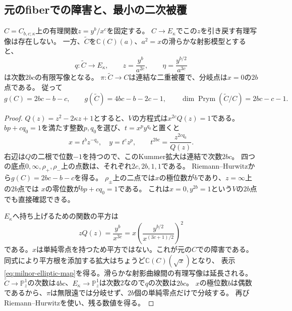 \subsection{元のfiberでの障害と、最小の二次被覆}
\begin{theorem}[平方類を解消するKummer被覆]
\label{thm:boundary-kummer-prym}
$C=C_{b,c;\kappa}$上の有理関数$z=y^b/x^c$を固定する。
$C\to E_\kappa$でこの$z$を引き戻す有理写像は存在しない。
一方、$\widetilde C$を$\mathbb C(C)(a)$、$a^2=x$の滑らかな射影模型とすると、
\begin{equation}\label{eq:milnor-elliptic-map}
 q:\widetilde C\longrightarrow E_\kappa,\qquad
 z=\frac{y^b}{a^{2c}},\qquad \eta=\frac{y^{b/2}}{a^{3c}}
\end{equation}
は次数$2bc$の有限写像となる。
$\pi:\widetilde C\to C$は連結な二重被覆で、分岐点は$x=0$の$2b$点である。
従って
\[
 g(C)=2bc-b-c,\qquad
 g(\widetilde C)=4bc-b-2c-1,\qquad
 \dim\operatorname{Prym}(\widetilde C/C)=2bc-c-1.
\]
\end{theorem}
\begin{proof}
$Q(z)=z^2-2\kappa z+1$とすると、$V$の方程式は$x^{2c}Q(z)=1$である。
$bp+cq_0=1$を満たす整数$p,q_0$を選び、$t=x^py^{q_0}$と置くと
\[
 x=t^bz^{-q_0},\quad y=t^cz^p,\qquad
 t^{2bc}=\frac{z^{2cq_0}}{Q(z)}.
\]
右辺は$Q$の二根で位数$-1$を持つので、このKummer拡大は連結で次数$2bc$。
四つの底点$0,\infty,\rho_+,\rho_-$上の点数は、それぞれ$2c,2b,1,1$である。
Riemann--Hurwitzから$g(C)=2bc-b-c$を得る。
$\rho_\pm$上の二点では$x$の極位数が$b$であり、$z=\infty$上の$2b$点では
$x$の零位数が$bp+cq_0=1$である。
これは$x=0,y^{2b}=1$という$V$の$2b$点でも直接確認できる。

$E_\kappa$へ持ち上げるための関数の平方は
\begin{equation}\label{eq:milnor-square-obstruction}
 zQ(z)=\frac{y^b}{x^{3c}}
      =x\left(\frac{y^{b/2}}{x^{(3c+1)/2}}\right)^2
\end{equation}
である。$x$は単純零点を持つため平方ではない。これが元の$C$での障害である。
同式により平方根を添加する拡大はちょうど$\mathbb C(C)(\sqrt x)$となり、
表示\eqref{eq:milnor-elliptic-map}を得る。滑らかな射影曲線間の有理写像は延長される。
$\widetilde C\to\mathbb P^1_z$の次数は$4bc$、$E_\kappa\to\mathbb P^1_z$は次数2なので$q$の次数は$2bc$。
$x$の極位数$b$は偶数であるから、$\pi$は無限遠では分岐せず、$2b$個の単純零点だけで分岐する。
再びRiemann--Hurwitzを使い、残る数値を得る。
\end{proof}

